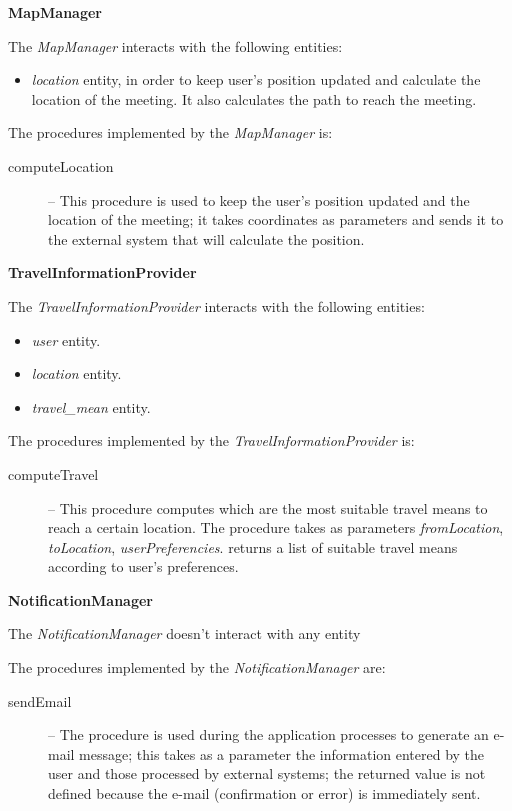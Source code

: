\documentclass{article}
\begin{document}
	\bigskip
	\noindent
	\textbf{MapManager}

	\bigskip
	\noindent
	The \textit{MapManager} interacts with the following entities:
	\begin{itemize}
	\item \textit{location} entity, in order to keep user’s position updated and calculate the location of the meeting. It also calculates the path to reach the meeting.
	\end{itemize}

	\bigskip
	The procedures implemented by the \textit{MapManager} is:
	\begin{description}
	\item [computeLocation] -- This procedure is used to keep the user's position updated and the location of the meeting; it takes coordinates as parameters and sends it to the external system that will calculate the position.
	\end{description}

	\bigskip
	\noindent
	\textbf{TravelInformationProvider}

	\bigskip
	\noindent
	The \textit{TravelInformationProvider} interacts with the following entities:
	\begin{itemize}
	\item \textit{user} entity.
	\item \textit{location} entity.
	\item \textit{travel\_mean} entity.
	\end{itemize}

	\bigskip
	The procedures implemented by the \textit{TravelInformationProvider} is:
	\begin{description}
	\item [computeTravel] -- This procedure computes which are the most suitable travel means to reach a certain location. The procedure takes as parameters \textit{fromLocation}, \textit{toLocation}, \textit{userPreferencies}. returns a list of suitable travel means according to user's preferences.
	\end{description}

	\bigskip
	\noindent
	\textbf{NotificationManager}

	\bigskip
	\noindent
	The \textit{NotificationManager} doesn't interact with any entity

	\bigskip
	The procedures implemented by the \textit{NotificationManager} are:
	\begin{description}
	\item [sendEmail] -- The procedure is used during the application processes to generate an e-mail message; this takes as a parameter the information entered by the user and those processed by external systems; the returned value is not defined because the e-mail (confirmation or error) is immediately sent.
	\end{description}
\end{document}
